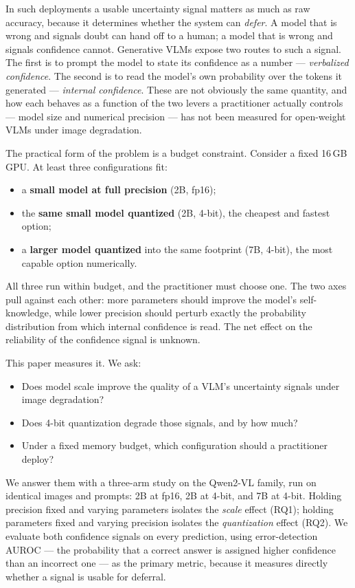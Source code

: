 \documentclass[11pt]{article}
\begin{document}
In such deployments a usable uncertainty signal matters as much as raw accuracy,
because it determines whether the system can \emph{defer}. A model that is wrong
and signals doubt can hand off to a human; a model that is wrong and signals
confidence cannot. Generative VLMs expose two routes to such a signal. The first
is to prompt the model to state its confidence as a number --- \emph{verbalized
confidence}. The second is to read the model's own probability over the tokens
it generated --- \emph{internal confidence}. These are not obviously the same
quantity, and how each behaves as a function of the two levers a practitioner
actually controls --- model size and numerical precision --- has not been
measured for open-weight VLMs under image degradation.

The practical form of the problem is a budget constraint. Consider a fixed
16\,GB GPU. At least three configurations fit:

\begin{itemize}
  \item a \textbf{small model at full precision} (2B, fp16);
  \item the \textbf{same small model quantized} (2B, 4-bit), the cheapest and
        fastest option;
  \item a \textbf{larger model quantized} into the same footprint (7B, 4-bit),
        the most capable option numerically.
\end{itemize}

\noindent All three run within budget, and the practitioner must choose one. The
two axes pull against each other: more parameters should improve the model's
self-knowledge, while lower precision should perturb exactly the probability
distribution from which internal confidence is read. The net effect on the
reliability of the confidence signal is unknown.

This paper measures it. We ask:

\begin{itemize}
  \item[\textbf{RQ1}] Does model scale improve the quality of a VLM's
        uncertainty signals under image degradation?
  \item[\textbf{RQ2}] Does 4-bit quantization degrade those signals, and by how
        much?
  \item[\textbf{RQ3}] Under a fixed memory budget, which configuration should a
        practitioner deploy?
\end{itemize}

We answer them with a three-arm study on the Qwen2-VL family, run on identical
images and prompts: 2B at fp16, 2B at 4-bit, and 7B at 4-bit. Holding precision
fixed and varying parameters isolates the \emph{scale} effect (RQ1); holding
parameters fixed and varying precision isolates the \emph{quantization} effect
(RQ2). We evaluate both confidence signals on every prediction, using
error-detection AUROC --- the probability that a correct answer is assigned
higher confidence than an incorrect one --- as the primary metric, because it
measures directly whether a signal is usable for deferral.
\end{document}
